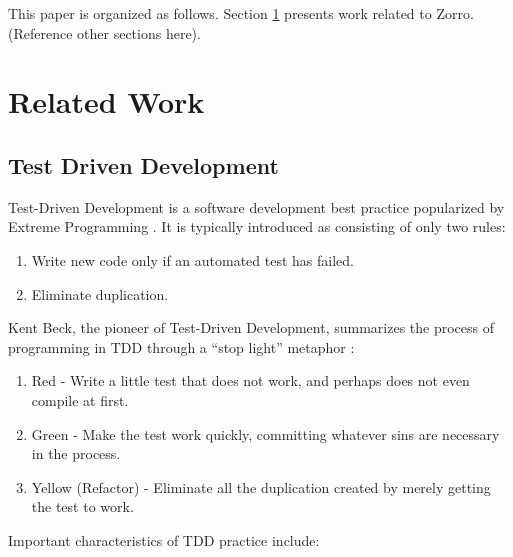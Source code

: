 \documentclass[smallextended]{svjour3}     %
\begin{document}
This paper is organized as follows.  Section \ref{sec:RelatedWork} presents work related to Zorro.  (Reference other sections here).

\section{Related Work}
\label{sec:RelatedWork}

\subsection{Test Driven Development}

Test-Driven Development\cite{Beck:03} is a software development 
best practice popularized by Extreme Programming \cite{Jeffries:00,Beck:00}. 
It is typically introduced as consisting of only two rules:

\begin{enumerate}
\item Write new code only if an automated test has failed.
\item Eliminate duplication.
\end{enumerate} 

Kent Beck, the pioneer of Test-Driven Development, summarizes the process of 
programming in TDD through a ``stop light'' metaphor \cite{Beck:03}: 
\begin{enumerate}
\item Red - Write a little test that does not work, and perhaps does not even compile at first.
\item Green - Make the test work quickly, committing whatever sins are necessary in the process.
\item Yellow (Refactor) - Eliminate all the duplication created by merely getting the test to work.
\end{enumerate}

Important characteristics of TDD practice include:
\end{document}
